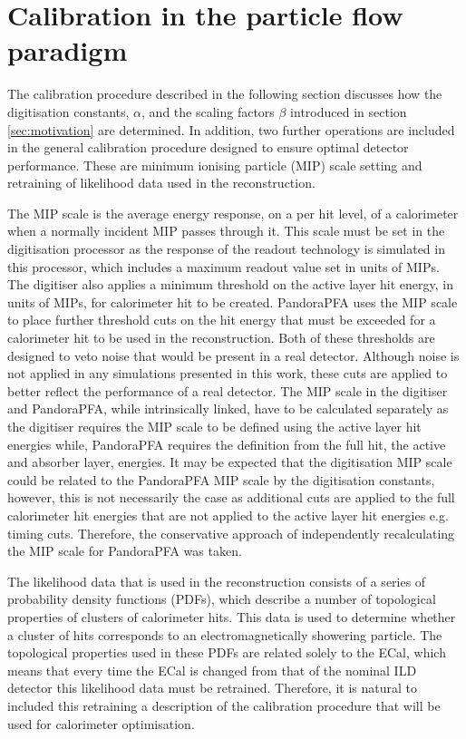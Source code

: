 \section{Calibration in the particle flow paradigm}
\label{sec:overviewcalibration}
The calibration procedure described in the following section discusses how the digitisation constants, $\alpha$, and the scaling factors $\beta$ introduced in section \ref{sec:motivation} are determined.  In addition, two further operations are included in the general calibration procedure designed to ensure optimal detector performance.  These are minimum ionising particle (MIP) scale setting and retraining of likelihood data used in the reconstruction.  

The MIP scale is the average energy response, on a per hit level, of a calorimeter when a normally incident MIP passes through it.  This scale must be set in the digitisation processor as the response of the readout technology is simulated in this processor, which includes a maximum readout value set in units of MIPs.  The digitiser also applies a minimum threshold on the active layer hit energy, in units of MIPs, for calorimeter hit to be created.  PandoraPFA uses the MIP scale to place further threshold cuts on the hit energy that must be exceeded for a calorimeter hit to be used in the reconstruction.  Both of these thresholds are designed to veto noise that would be present in a real detector.  Although noise is not applied in any simulations presented in this work, these cuts are applied to better reflect the performance of a real detector.  The MIP scale in the digitiser and PandoraPFA, while intrinsically linked, have to be calculated separately as the digitiser requires the MIP scale to be defined using the active layer hit energies while, PandoraPFA requires the definition from the full hit, the active and absorber layer, energies.  It may be expected that the digitisation MIP scale could be related to the PandoraPFA MIP scale by the digitisation constants, however, this is not necessarily the case as additional cuts are applied to the full calorimeter hit energies that are not applied to the active layer hit energies e.g. timing cuts.  Therefore, the conservative approach of independently recalculating the MIP scale for PandoraPFA was taken.   

The likelihood data that is used in the reconstruction consists of a series of probability density functions (PDFs), which describe a number of topological properties of clusters of calorimeter hits.  This data is used to determine whether a cluster of hits corresponds to an electromagnetically showering particle.  The topological properties used in these PDFs are related solely to the ECal, which means that every time the ECal is changed from that of the nominal ILD detector this likelihood data must be retrained.  Therefore, it is natural to included this retraining a description of the calibration procedure that will be used for calorimeter optimisation.

